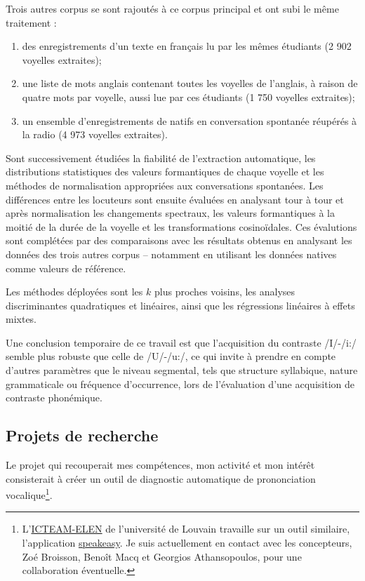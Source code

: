 \documentclass[
  10pt,
]{article}
\begin{document}
Trois autres corpus se sont rajoutés à ce corpus principal et ont subi le même traitement :

\begin{enumerate}
\def\labelenumi{\arabic{enumi}.}
\item
  des enregistrements d'un texte en français lu par les mêmes étudiants (2 902 voyelles extraites);
\item
  une liste de mots anglais contenant toutes les voyelles de l'anglais, à raison de quatre mots
  par voyelle, aussi lue par ces étudiants (1 750 voyelles extraites);
\item
  un ensemble d'enregistrements de natifs en conversation spontanée réupérés à la radio
  (4 973 voyelles extraites).
\end{enumerate}

Sont successivement étudiées la fiabilité de l'extraction automatique, les distributions statistiques
des valeurs formantiques de chaque voyelle et les méthodes de normalisation appropriées aux
conversations spontanées. Les différences entre les locuteurs sont ensuite évaluées en analysant
tour à tour et après normalisation les changements spectraux, les valeurs formantiques à la moitié
de la durée de la voyelle et les transformations cosinoïdales. Ces évalutions sont complétées par
des comparaisons avec les résultats obtenus en analysant les données des trois autres corpus --
notamment en utilisant les données natives comme valeurs de référence.

Les méthodes déployées sont les \(k\) plus proches voisins, les analyses discriminantes quadratiques
et linéaires, ainsi que les régressions linéaires à effets mixtes.

Une conclusion temporaire de ce travail est que l'acquisition du contraste /I/-/i:/ semble plus
robuste que celle de /U/-/u:/, ce qui invite à prendre en compte d'autres paramètres que le niveau
segmental, tels que structure syllabique, nature grammaticale ou fréquence d'occurrence, lors de l'évaluation d'une acquisition de contraste phonémique.

\pagebreak

\hypertarget{projets-de-recherche}{%
\subsection{Projets de recherche}\label{projets-de-recherche}}

Le projet qui recouperait mes compétences, mon activité et mon intérêt consisterait
à créer un outil de diagnostic automatique de prononciation
vocalique\footnote{L'\href{https://sites.uclouvain.be/elen/}{ICTEAM-ELEN} de l'université de
  Louvain travaille sur un outil similaire, l'application
  \href{https://www.speasy.app/}{speakeasy}. Je suis actuellement en contact avec les
  concepteurs, Zoé Broisson, Benoît Macq et Georgios Athansopoulos, pour une
  collaboration éventuelle.}.
\end{document}
